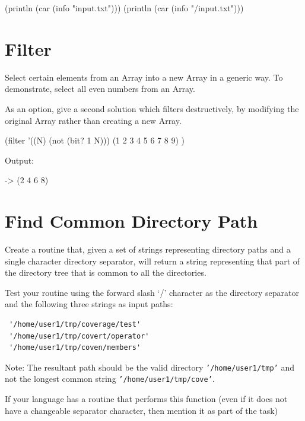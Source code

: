 \begin{wideverbatim}

(println (car (info "input.txt")))
(println (car (info "/input.txt")))

\end{wideverbatim}

\pagebreak{}
\section*{Filter}

Select certain elements from an Array into a new Array in a generic way.
To demonstrate, select all even numbers from an Array.

As an option, give a second solution which filters destructively, by
modifying the original Array rather than creating a new Array.

\begin{wideverbatim}

(filter '((N) (not (bit? 1 N)))
   (1 2 3 4 5 6 7 8 9) )

Output:

-> (2 4 6 8)

\end{wideverbatim}

\pagebreak{}
\section*{Find Common Directory Path}

Create a routine that, given a set of strings representing directory
paths and a single character directory separator, will return a string
representing that part of the directory tree that is common to all the
directories.

Test your routine using the forward slash `/' character as the directory
separator and the following three strings as input paths:

\begin{verbatim}
 '/home/user1/tmp/coverage/test'
 '/home/user1/tmp/covert/operator'
 '/home/user1/tmp/coven/members'
\end{verbatim}

Note: The resultant path should be the valid directory
\texttt{'/home/user1/tmp'} and not the longest common string
\texttt{'/home/user1/tmp/cove'}.

If your language has a routine that performs this function (even if it
does not have a changeable separator character, then mention it as
part of the task)

